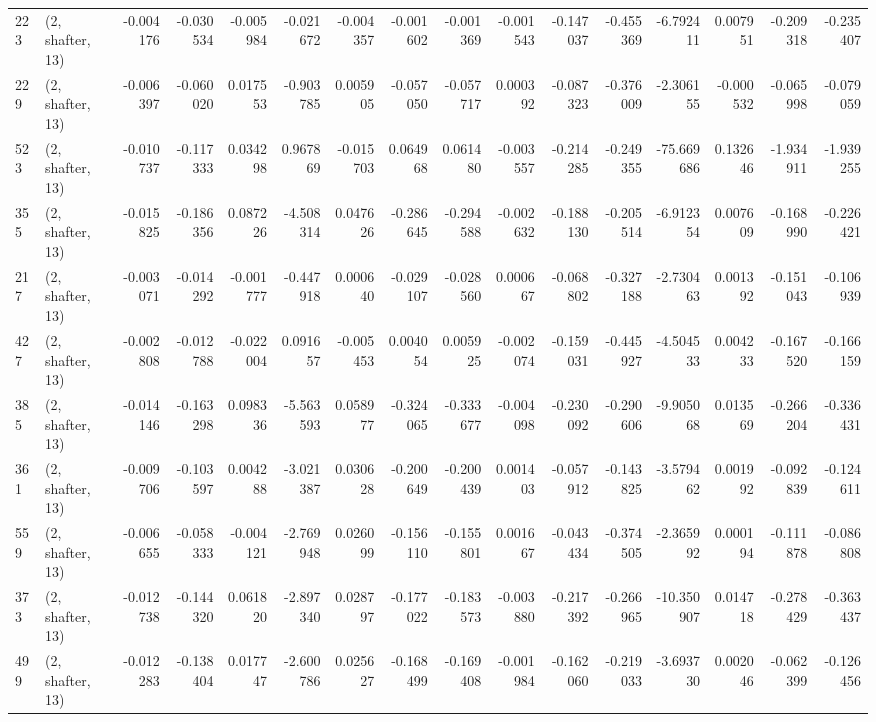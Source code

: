 \begin{tabular}{llrrrrrrrrrrrrrr}
223 &  (2, shafter, 13) &  -0.004176 & -0.030534 & -0.005984 &   -0.021672 & -0.004357 &  -0.001602 & -0.001369 & -0.001543 & -0.147037 & -0.455369 &   -6.792411 &  0.007951 & -0.209318 & -0.235407 \\
229 &  (2, shafter, 13) &  -0.006397 & -0.060020 &  0.017553 &   -0.903785 &  0.005905 &  -0.057050 & -0.057717 &  0.000392 & -0.087323 & -0.376009 &   -2.306155 & -0.000532 & -0.065998 & -0.079059 \\
523 &  (2, shafter, 13) &  -0.010737 & -0.117333 &  0.034298 &    0.967869 & -0.015703 &   0.064968 &  0.061480 & -0.003557 & -0.214285 & -0.249355 &  -75.669686 &  0.132646 & -1.934911 & -1.939255 \\
355 &  (2, shafter, 13) &  -0.015825 & -0.186356 &  0.087226 &   -4.508314 &  0.047626 &  -0.286645 & -0.294588 & -0.002632 & -0.188130 & -0.205514 &   -6.912354 &  0.007609 & -0.168990 & -0.226421 \\
217 &  (2, shafter, 13) &  -0.003071 & -0.014292 & -0.001777 &   -0.447918 &  0.000640 &  -0.029107 & -0.028560 &  0.000667 & -0.068802 & -0.327188 &   -2.730463 &  0.001392 & -0.151043 & -0.106939 \\
427 &  (2, shafter, 13) &  -0.002808 & -0.012788 & -0.022004 &    0.091657 & -0.005453 &   0.004054 &  0.005925 & -0.002074 & -0.159031 & -0.445927 &   -4.504533 &  0.004233 & -0.167520 & -0.166159 \\
385 &  (2, shafter, 13) &  -0.014146 & -0.163298 &  0.098336 &   -5.563593 &  0.058977 &  -0.324065 & -0.333677 & -0.004098 & -0.230092 & -0.290606 &   -9.905068 &  0.013569 & -0.266204 & -0.336431 \\
361 &  (2, shafter, 13) &  -0.009706 & -0.103597 &  0.004288 &   -3.021387 &  0.030628 &  -0.200649 & -0.200439 &  0.001403 & -0.057912 & -0.143825 &   -3.579462 &  0.001992 & -0.092839 & -0.124611 \\
559 &  (2, shafter, 13) &  -0.006655 & -0.058333 & -0.004121 &   -2.769948 &  0.026099 &  -0.156110 & -0.155801 &  0.001667 & -0.043434 & -0.374505 &   -2.365992 &  0.000194 & -0.111878 & -0.086808 \\
373 &  (2, shafter, 13) &  -0.012738 & -0.144320 &  0.061820 &   -2.897340 &  0.028797 &  -0.177022 & -0.183573 & -0.003880 & -0.217392 & -0.266965 &  -10.350907 &  0.014718 & -0.278429 & -0.363437 \\
499 &  (2, shafter, 13) &  -0.012283 & -0.138404 &  0.017747 &   -2.600786 &  0.025627 &  -0.168499 & -0.169408 & -0.001984 & -0.162060 & -0.219033 &   -3.693730 &  0.002046 & -0.062399 & -0.126456 \\

\end{tabular}
